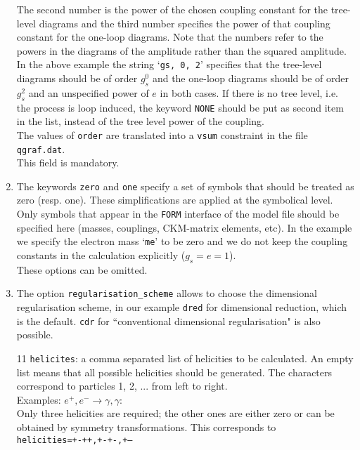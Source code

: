 \documentclass[11pt,a4paper]{refrep}
\newcommand{\form}{{\tt FORM}\xspace}
\begin{document}
\begin{enumerate}
The second number is the power of the chosen coupling constant for the
tree-level diagrams and the third number specifies the power of that
coupling constant for the one-loop diagrams.
Note that the numbers
refer to the powers in the diagrams of the amplitude
rather than the squared amplitude. In the above example the
string `\lstinline[basicstyle=\ttfamily]{gs, 0, 2}' specifies that
the tree-level diagrams should be of order $g_s^0$ and the one-loop
diagrams should be of order $g_s^2$ and an unspecified
power of $e$ in both cases. 
If there is no tree level, i.e. the process is loop induced, 
the keyword \texttt{NONE} should be put as second item in the list,
instead of the tree level power of the coupling.\\
The values of {\tt order} are
translated into a \texttt{vsum} constraint in the file \texttt{qgraf.dat}.
\\This field is mandatory.
\item[8--9] The keywords \texttt{zero} and \texttt{one} specify
a set of symbols that should be treated as zero (resp. one). These
simplifications are applied at the symbolical level. Only symbols
that appear in the \form{} interface of the model file should be
specified here (masses, couplings, CKM-matrix elements, etc).
In the example we specify the electron mass
`\lstinline[basicstyle=\ttfamily]{me}' to be zero and we do not keep
the coupling constants in the calculation explicitly ($g_s=e=1$).
\\These options can be omitted.
\item[10] The option \texttt{regularisation\_scheme} 
allows to choose the dimensional regularisation scheme, in our example {\tt dred} for 
dimensional reduction, which is the default.
{\tt cdr} for ``conventional dimensional regularisation" is also possible.
\item[11] \texttt{helicites}:  a comma separated list of helicities to be calculated. 
An empty list means that all possible helicities should be generated.         
The characters correspond to particles 1, 2, ... from left to right.   \\
 Examples:                                                       
 $e^+, e^- \to \gamma, \gamma$:    \\                               
 Only three helicities are required; the other ones are         
  either zero or can be obtained by symmetry                 
  transformations. This corresponds to\\                                       
      {\tt  helicities=+-++,+-+-,+---}  \\

\end{enumerate}
\end{document}
